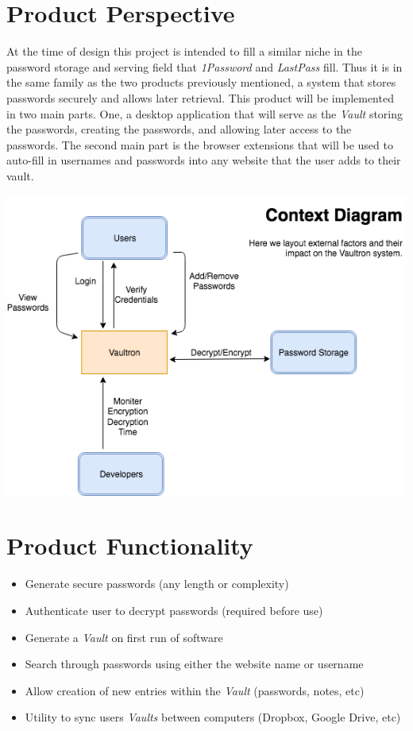 \documentclass[11pt]{report}
\begin{document}
\section{Product Perspective}
At the time of design this project is intended to fill a similar
niche in the password storage and serving field that \textit{1Password}
and \textit{LastPass} fill. Thus it is in the same family as
the two products previously mentioned, a system that stores passwords
securely and allows later retrieval. This product will be implemented in
two main parts. One, a desktop application that will serve as the \textit{Vault}
storing the passwords, creating the passwords, and allowing later access
to the passwords. The second main part is the browser extensions that
will be used to auto-fill in usernames and passwords into any website
that the user adds to their vault. 

\includegraphics[scale=0.75]{context-diagram}


\section{Product Functionality}

\begin{itemize}
    \item Generate secure passwords (any length or complexity)
    \item Authenticate user to decrypt passwords (required before use)
    \item Generate a \textit{Vault} on first run of software
    \item Search through passwords using either the website name or username
    \item Allow creation of new entries within the \textit{Vault} (passwords, notes, etc)
    \item Utility to sync users \textit{Vaults} between computers (Dropbox, Google Drive, etc)
\end{itemize}
\end{document}
